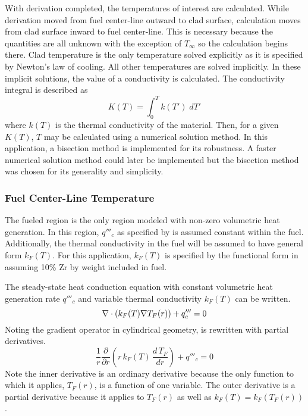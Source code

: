     With derivation completed, the temperatures of interest are calculated.
    While derivation moved from fuel center-line outward to clad surface,
    calculation moves from clad surface inward to fuel center-line. This is
    necessary because the quantities are all unknown with the exception of
    $T_{\infty}$ so the calculation begins there. Clad temperature is the only
    temperature solved explicitly as it is specified by Newton's law of cooling.
    All other temperatures are solved implicitly. In these implicit solutions,
    the value of a conductivity is calculated. The conductivity integral is
    described as
    \begin{equation}
      \label{eq:conductivity_integral}
      K(T) = \int_0^T k(T') \; dT'
    \end{equation}
    where $k(T)$ is the thermal conductivity of the material. Then, for a given
    $K(T)$, $T$ may be calculated using a numerical solution method. In this
    application, a bisection method is implemented for its robustness. A faster
    numerical solution method could later be implemented but the bisection
    method was chosen for its generality and simplicity.

    \subsubsection{Fuel Center-Line Temperature}
      The fueled region is the only region modeled with non-zero volumetric heat
      generation. In this region, $q'''_c$ as specified by 
       is assumed constant within the fuel. 
      Additionally, the thermal conductivity in the fuel will be assumed to have
      general form $k_F(T)$. For this application, $k_F(T)$ is specified by the
      functional form in \cite{fuelProp} assuming 10\% Zr by weight included in
      fuel.

      The steady-state heat conduction equation with constant volumetric heat
      generation rate $q'''_c$ and variable thermal conductivity $k_F(T)$ can be
      written.
      \begin{equation}
        \label{eq:conduction_fuel}
        \mathbf{\nabla} \cdot (k_F(T) \mathbf{\nabla} T_F(r)) + q'''_c = 0
      \end{equation}
      Noting the gradient operator in cylindrical geometry,
       is rewritten with partial derivatives.
      \begin{equation}
        \label{eq:conduction_fuel_cylindrical}
        \frac{1}{r} \frac{\partial}{\partial r} \left( r \, k_F(T) \, 
          \frac{d \, T_F}{dr} \right) + q'''_c = 0
      \end{equation}
      Note the inner derivative is an ordinary derivative because the only
      function to which it applies, $T_F(r)$, is a function of one variable. The
      outer derivative is a partial derivative because it applies to $T_F(r)$ as
      well as $k_F(T) = k_F(T_F(r))$.

